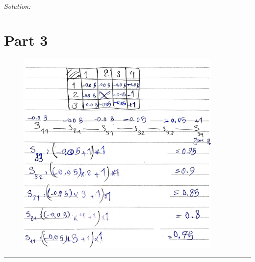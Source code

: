 \documentclass[a4paper, 11pt]{article}
\newenvironment{solution}
    {\textit{Solution:}}
    {}
\begin{document}
{\begin{solution}
 	 	 	\section*{\small Part 3}
 	\begin{figure}[H]
 		\centering
 		\includegraphics[width=0.9\textwidth]{4.jpg}
 	\end{figure}
\end{solution}
\noindent\rule{7in}{2.8pt}
\pagebreak
\end{document}
